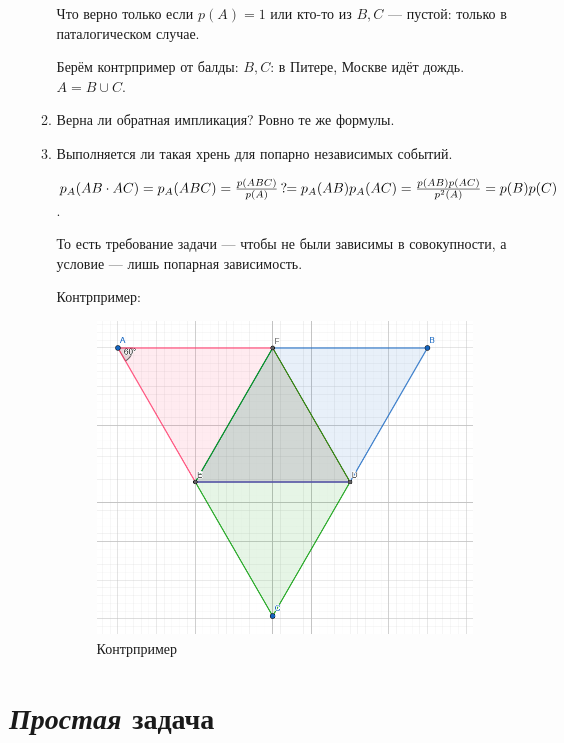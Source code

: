 \documentclass[12pt, a4paper]{article}
\begin{document}
\begin{enumerate}
\begin{enumerate}
        Что верно только если $p(A) = 1$ или кто-то из $B, C$ — пустой: только в паталогическом случае.

        Берём контрпример от балды: $B, C$: в Питере, Москве идёт дождь. $A = B \cup C$.

        \item Верна ли обратная импликация? Ровно те же формулы.
        
        \item Выполняется ли такая хрень для попарно независимых событий.
        
        $p_A(AB \cdot AC) = p_A(ABC) = \frac{p(ABC)}{p(A)} \,?\!\!= p_A(AB)p_A(AC) = \frac{p(AB)p(AC)}{p^2(A)} = p(B)p(C)$.

        То есть требование задачи — чтобы не были зависимы в совокупности, а условие — лишь попарная зависимость.

        Контрпример:

        \begin{figure}
            \centering
            \includegraphics[width=\paperwidth]{res/counterexample.png}
            \caption{Контрпример}
            \label{fig:counterexample}
        \end{figure}
        \FloatBarrier
    \end{enumerate}
\end{enumerate}


\section{\textit{Простая} задача}
\end{document}
